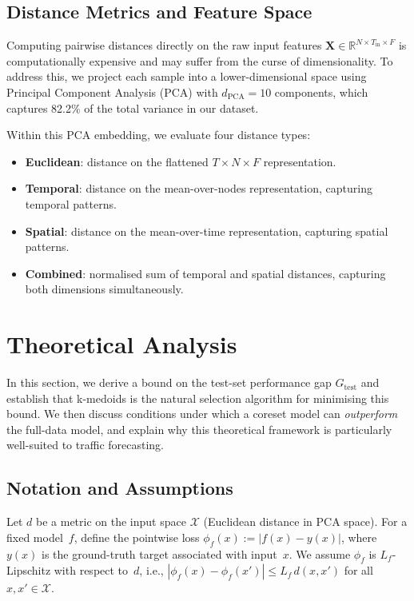 \documentclass[journal]{IEEEtran}
\newcommand{\Gtest}{G_{\mathrm{test}}}
\begin{document}
\subsection{Distance Metrics and Feature Space}
\label{sec:distance}

Computing pairwise distances directly on the raw input features
$\mathbf{X} \in \mathbb{R}^{N \times T_{\mathrm{in}} \times F}$
is computationally expensive and may suffer from the curse of
dimensionality.
To address this, we project each sample into a lower-dimensional
space using Principal Component Analysis (PCA) with
$d_{\mathrm{PCA}} = 10$ components, which captures 82.2\% of the
total variance in our dataset.

Within this PCA embedding, we evaluate four distance types:
\begin{itemize}
  \item \textbf{Euclidean}: distance on the flattened
    $T \times N \times F$ representation.
  \item \textbf{Temporal}: distance on the mean-over-nodes
    representation, capturing temporal patterns.
  \item \textbf{Spatial}: distance on the mean-over-time
    representation, capturing spatial patterns.
  \item \textbf{Combined}: normalised sum of temporal and spatial
    distances, capturing both dimensions simultaneously.
\end{itemize}


\section{Theoretical Analysis}
\label{sec:theory}

In this section, we derive a bound on the test-set performance gap
$\Gtest$ and establish that k-medoids is the natural selection
algorithm for minimising this bound.
We then discuss conditions under which a coreset model can
\emph{outperform} the full-data model, and explain why this
theoretical framework is particularly well-suited to traffic
forecasting.

\subsection{Notation and Assumptions}

Let $d$ be a metric on the input space $\mathcal{X}$
(Euclidean distance in PCA space).
For a fixed model~$f$, define the pointwise loss
$\phi_f(x) := |f(x) - y(x)|$,
where $y(x)$ is the ground-truth target associated with input~$x$.
We assume $\phi_f$ is $L_f$-Lipschitz with respect to~$d$, i.e.,
$|\phi_f(x) - \phi_f(x')| \le L_f \, d(x, x')$ for all
$x, x' \in \mathcal{X}$.
\end{document}
